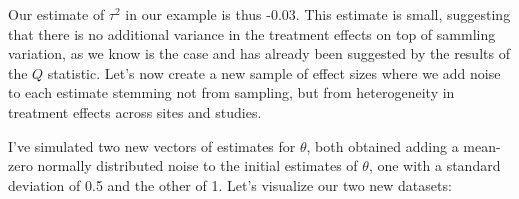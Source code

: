 \documentclass[
]{book}
\newenvironment{Shaded}{\begin{snugshade}}{\end{snugshade}}
\newcommand{\AttributeTok}[1]{\textcolor[rgb]{0.77,0.63,0.00}{#1}}
\newcommand{\DecValTok}[1]{\textcolor[rgb]{0.00,0.00,0.81}{#1}}
\newcommand{\FloatTok}[1]{\textcolor[rgb]{0.00,0.00,0.81}{#1}}
\newcommand{\FunctionTok}[1]{\textcolor[rgb]{0.00,0.00,0.00}{#1}}
\newcommand{\NormalTok}[1]{#1}
\newcommand{\OtherTok}[1]{\textcolor[rgb]{0.56,0.35,0.01}{#1}}
\newcommand{\SpecialCharTok}[1]{\textcolor[rgb]{0.00,0.00,0.00}{#1}}
\theoremstyle{definition}
\theoremstyle{definition}
\theoremstyle{definition}
\theoremstyle{definition}
\theoremstyle{remark}
\begin{document}
Our estimate of \(\tau^2\) in our example is thus -0.03.
This estimate is small, suggesting that there is no additional variance in the treatment effects on top of sammling variation, as we know is the case and has already been suggested by the results of the \(Q\) statistic.
Let's now create a new sample of effect sizes where we add noise to each estimate stemming not from sampling, but from heterogeneity in treatment effects across sites and studies.

\begin{Shaded}
\end{Shaded}

I've simulated two new vectors of estimates for \(\theta\), both obtained adding a mean-zero normally distributed noise to the initial estimates of \(\theta\), one with a standard deviation of 0.5 and the other of 1.
Let's visualize our two new datasets:
\end{document}
